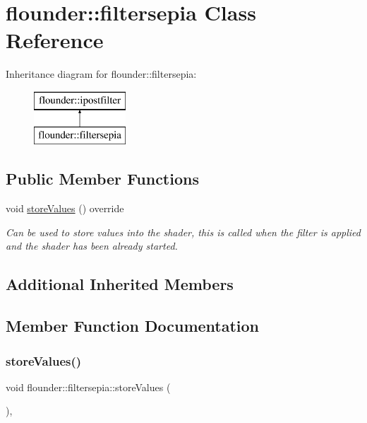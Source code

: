 \hypertarget{classflounder_1_1filtersepia}{}\section{flounder\+:\+:filtersepia Class Reference}
\label{classflounder_1_1filtersepia}
Inheritance diagram for flounder\+:\+:filtersepia\+:\begin{figure}[H]
\begin{center}
\leavevmode
\includegraphics[height=2.000000cm]{classflounder_1_1filtersepia}
\end{center}
\end{figure}
\subsection*{Public Member Functions}
\begin{DoxyCompactItemize}
\item 
void \hyperlink{classflounder_1_1filtersepia_a92d9cee7e92200212f40ff39f5cbc67f}{store\+Values} () override
\begin{DoxyCompactList}\small\item\em Can be used to store values into the shader, this is called when the filter is applied and the shader has been already started. \end{DoxyCompactList}\end{DoxyCompactItemize}
\subsection*{Additional Inherited Members}


\subsection{Member Function Documentation}
\mbox{\label{classflounder_1_1filtersepia_a92d9cee7e92200212f40ff39f5cbc67f}} 
\subsubsection{\texorpdfstring{store\+Values()}{storeValues()}}
{\footnotesize\ttfamily void flounder\+::filtersepia\+::store\+Values (\begin{DoxyParamCaption}{ }\end{DoxyParamCaption})\hspace{0.3cm}{\ttfamily [override]}, {\ttfamily [virtual]}}



